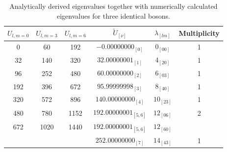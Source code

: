 \begin{table}[h!]
	\centering
	\begin{tabular}{||c c c | c c c||} 
		\hline 
		$U_{l,m=0}$ & $U_{l,m=3}$ & $U_{l,m=6}$ & $\tilde{U}_{[\nu]}$ & $\lambda_{[lm]}$& Multiplicity \Tstrut\Bstrut \\ [0.7ex] 
		\hline\hline
		0		& 60     & 192 & $-0.00000000_{[0]}$ & $0_{[00]}$ & 1  \\ 
		32 & 140   & 320 & $32.00000001_{[1]}$ & $4_{[20]}$ & 1  \\
		96  & 252  & 480 & $60.00000000_{[2]}$& $6_{[03]}$ & 1  \\
		192& 396  & 672  & $95.99999998_{[3]}$ & $8_{[40]}$ & 1  \\
		320 & 572  & 896  & $140.00000000_{[4]}$&$10_{[23]}$ & 1  \\
		480  & 780  & 1152 & $192.00000001_{[5,6]}$ & $12_{[06]}$ & 2  \\  
		672  & 1020  & 1440 & $192.00000001_{[5,6]}$ & $12_{[60]}$ &  \\  
		   &  &  & $252.00000000_{[7]}$ & $14_{[43]}$ & 1  \\ [1ex] 
		\hline
	\end{tabular}
	\caption{Analytically derived eigenvalues together with numerically calculated eigenvalues for three identical bosons.}
	\label{table:1}
\end{table} 
